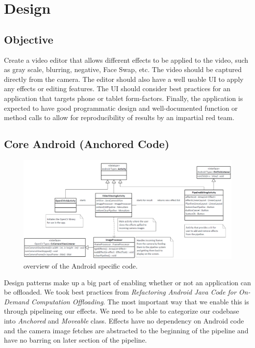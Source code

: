 \documentclass{sig-alternate}
\begin{document}
\section{Design}
\subsection{Objective}
Create a video editor  that allows different effects to be applied to the video, such as gray scale, blurring, negative, Face Swap, etc. The video should be captured directly from the camera. The editor should also have a well usable UI to apply any effects or editing features. The UI should consider best practices for an application  that targets phone or tablet form-factors. Finally, the application is expected to have good programmatic design and  well-documented function or method calls to allow for reproducibility of results by  an impartial red team.

\subsection{Core Android (Anchored Code)}
\begin{figure}[H]
\noindent \includegraphics[scale=.2]{coreUML.png}
\caption{overview of the Android specific code.}
\end{figure}
Design patterns make up a big part of enabling whether or not an application can be offloaded. We took best practices from \textit{Refactoring Android Java Code for On-Demand Computation Offloading}. The most important way that we enable this is through pipelineing our effects. We need to be able to categorize our codebase into \textit{Anchored} and \textit{Moveable} class. Effects have no dependency on Android code and the camera image fetches are abstracted to the beginning of the pipeline and have no barring on later section of the pipeline. \cite{AndroidRefactor}
\end{document}
